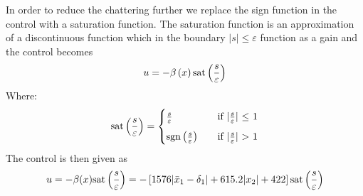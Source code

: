 In order to reduce the chattering further we replace the sign function in the control with a saturation function. The saturation function is an approximation of a discontinuous function which in the boundary $\vert s \vert \leq \varepsilon$ function as a gain and the control becomes
\begin{equation}
  u = -\beta\left( x \right) \mathrm{sat}\left( \frac{s}{\varepsilon} \right)
\end{equation}
Where:
\begin{equation}
  \mathrm{sat}\left( \frac{s}{\varepsilon} \right) =
  \begin{cases}
    \frac{s}{\varepsilon} &\quad \text{if $\vert\frac{s}{\varepsilon}\vert$ $\leq$ 1} \\[2mm]
    \mathrm{sgn}\left( \frac{s}{\varepsilon} \right) &\quad \text{if $\vert \frac{s}{\varepsilon}\vert$ $>$ 1}
  \end{cases}
\end{equation}
The control is then given as
\begin{equation}
        u = -\beta(x)\mathrm{sat}\left(\frac{s}{\varepsilon}\right) =  -\left[ 1576 \vert \bar{x}_1-\delta_1 \vert + 615.2\vert x_2 \vert + 422 \right]\mathrm{sat}\left(\frac{s}{\varepsilon}\right)
\end{equation}
